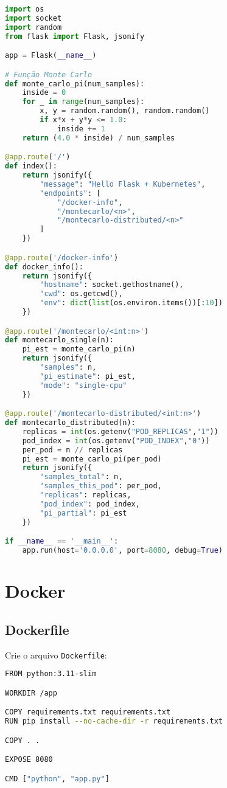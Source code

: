 \documentclass[a4paper,12pt]{article}
\begin{document}
\begin{lstlisting}[language=Python]
import os
import socket
import random
from flask import Flask, jsonify

app = Flask(__name__)

# Função Monte Carlo
def monte_carlo_pi(num_samples):
    inside = 0
    for _ in range(num_samples):
        x, y = random.random(), random.random()
        if x*x + y*y <= 1.0:
            inside += 1
    return (4.0 * inside) / num_samples

@app.route('/')
def index():
    return jsonify({
        "message": "Hello Flask + Kubernetes",
        "endpoints": [
            "/docker-info",
            "/montecarlo/<n>",
            "/montecarlo-distributed/<n>"
        ]
    })

@app.route('/docker-info')
def docker_info():
    return jsonify({
        "hostname": socket.gethostname(),
        "cwd": os.getcwd(),
        "env": dict(list(os.environ.items())[:10])
    })

@app.route('/montecarlo/<int:n>')
def montecarlo_single(n):
    pi_est = monte_carlo_pi(n)
    return jsonify({
        "samples": n,
        "pi_estimate": pi_est,
        "mode": "single-cpu"
    })

@app.route('/montecarlo-distributed/<int:n>')
def montecarlo_distributed(n):
    replicas = int(os.getenv("POD_REPLICAS","1"))
    pod_index = int(os.getenv("POD_INDEX","0"))
    per_pod = n // replicas
    pi_est = monte_carlo_pi(per_pod)
    return jsonify({
        "samples_total": n,
        "samples_this_pod": per_pod,
        "replicas": replicas,
        "pod_index": pod_index,
        "pi_partial": pi_est
    })

if __name__ == '__main__':
    app.run(host='0.0.0.0', port=8080, debug=True)
\end{lstlisting}

\section{Docker}

\subsection{Dockerfile}

Crie o arquivo \texttt{Dockerfile}:

\begin{lstlisting}[language=bash]
FROM python:3.11-slim

WORKDIR /app

COPY requirements.txt requirements.txt
RUN pip install --no-cache-dir -r requirements.txt

COPY . .

EXPOSE 8080

CMD ["python", "app.py"]
\end{lstlisting}
\end{document}
